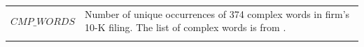 \documentclass[
  12pt,
  a4paper,
  twoside,
  onecolumn]{article}
\begin{document}
\begin{landscape}
\begin{ThreePartTable}
\begin{spacing}{1.0}
\begin{longtable}[t]{>{\raggedright\arraybackslash}p{5.2cm}>{\raggedright\arraybackslash}p{15.6cm}}
\addlinespace
$CMP\_WORDS$ & Number of unique occurrences of 374 complex words in firm's 10-K filing. The list of complex words is from \cite{lm_2020_firm_complexity}.\\*
\end{longtable}
\end{spacing}
\end{ThreePartTable}
\endgroup{}
\end{landscape}
\restoregeometry
 \clearpage
\end{document}
